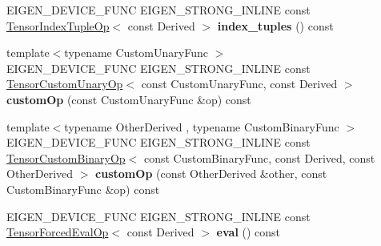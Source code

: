 \begin{DoxyCompactItemize}
\item 
\mbox{\label{class_eigen_1_1_tensor_base_3_01_derived_00_01_read_only_accessors_01_4_a88ffbfd5a893734ae8ee281026a9573a}} 
E\+I\+G\+E\+N\+\_\+\+D\+E\+V\+I\+C\+E\+\_\+\+F\+U\+NC E\+I\+G\+E\+N\+\_\+\+S\+T\+R\+O\+N\+G\+\_\+\+I\+N\+L\+I\+NE const \hyperlink{class_eigen_1_1_tensor_index_tuple_op}{Tensor\+Index\+Tuple\+Op}$<$ const Derived $>$ {\bfseries index\+\_\+tuples} () const
\item 
\mbox{\label{class_eigen_1_1_tensor_base_3_01_derived_00_01_read_only_accessors_01_4_acb888ea34ad7fa4ea35d713c08fed4d0}} 
{\footnotesize template$<$typename Custom\+Unary\+Func $>$ }\\E\+I\+G\+E\+N\+\_\+\+D\+E\+V\+I\+C\+E\+\_\+\+F\+U\+NC E\+I\+G\+E\+N\+\_\+\+S\+T\+R\+O\+N\+G\+\_\+\+I\+N\+L\+I\+NE const \hyperlink{class_eigen_1_1_tensor_custom_unary_op}{Tensor\+Custom\+Unary\+Op}$<$ const Custom\+Unary\+Func, const Derived $>$ {\bfseries custom\+Op} (const Custom\+Unary\+Func \&op) const
\item 
\mbox{\label{class_eigen_1_1_tensor_base_3_01_derived_00_01_read_only_accessors_01_4_ae4d6a96cd592d11c9b5cf05a20626bd4}} 
{\footnotesize template$<$typename Other\+Derived , typename Custom\+Binary\+Func $>$ }\\E\+I\+G\+E\+N\+\_\+\+D\+E\+V\+I\+C\+E\+\_\+\+F\+U\+NC E\+I\+G\+E\+N\+\_\+\+S\+T\+R\+O\+N\+G\+\_\+\+I\+N\+L\+I\+NE const \hyperlink{class_eigen_1_1_tensor_custom_binary_op}{Tensor\+Custom\+Binary\+Op}$<$ const Custom\+Binary\+Func, const Derived, const Other\+Derived $>$ {\bfseries custom\+Op} (const Other\+Derived \&other, const Custom\+Binary\+Func \&op) const
\item 
\mbox{\label{class_eigen_1_1_tensor_base_3_01_derived_00_01_read_only_accessors_01_4_abf8095f6660f4aee94307b485dfbe55e}} 
E\+I\+G\+E\+N\+\_\+\+D\+E\+V\+I\+C\+E\+\_\+\+F\+U\+NC E\+I\+G\+E\+N\+\_\+\+S\+T\+R\+O\+N\+G\+\_\+\+I\+N\+L\+I\+NE const \hyperlink{class_eigen_1_1_tensor_forced_eval_op}{Tensor\+Forced\+Eval\+Op}$<$ const Derived $>$ {\bfseries eval} () const
\item 

\end{DoxyCompactItemize}
